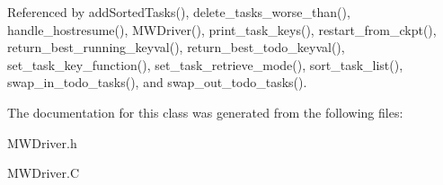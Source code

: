 Referenced by add\+Sorted\+Tasks(), delete\+\_\+tasks\+\_\+worse\+\_\+than(), handle\+\_\+hostresume(), M\+W\+Driver(), print\+\_\+task\+\_\+keys(), restart\+\_\+from\+\_\+ckpt(), return\+\_\+best\+\_\+running\+\_\+keyval(), return\+\_\+best\+\_\+todo\+\_\+keyval(), set\+\_\+task\+\_\+key\+\_\+function(), set\+\_\+task\+\_\+retrieve\+\_\+mode(), sort\+\_\+task\+\_\+list(), swap\+\_\+in\+\_\+todo\+\_\+tasks(), and swap\+\_\+out\+\_\+todo\+\_\+tasks().



The documentation for this class was generated from the following files\+:\begin{DoxyCompactItemize}
\item 
M\+W\+Driver.\+h\item 
M\+W\+Driver.\+C\end{DoxyCompactItemize}
